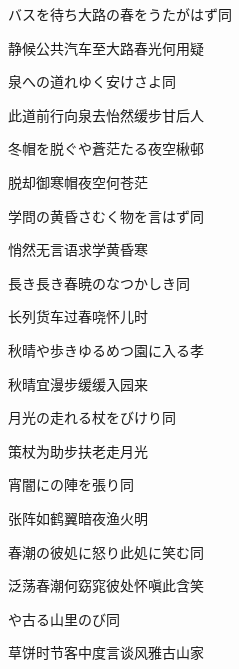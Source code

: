 \begin{haiku}
    {\FH バスを待ち大路の春をうたがはず}\hfill{\FH 同}

    {\FK 静候公共汽车至大路春光何用疑}
\end{haiku}

\begin{haiku}
    {\FH 泉への道れゆく安けさよ}\hfill{\FH 同}

    {\FK 此道前行向泉去怡然缓步甘后人}
\end{haiku}

\begin{haiku}
    {\FH 冬帽を脱ぐや蒼茫たる夜空}\hfill{\FH 楸邨}

    {\FK 脱却御寒帽夜空何苍茫}
\end{haiku}

\begin{haiku}
    {\FH 学問の黄昏さむく物を言はず}\hfill{\FH 同}

    {\FK 悄然无言语求学黄昏寒}
\end{haiku}

\begin{haiku}
    {\FH 長き長き春暁のなつかしき}\hfill{\FH 同}

    {\FK 长列货车过春哓怀儿时}
\end{haiku}

\begin{haiku}
    {\FH 秋晴や歩きゆるめつ園に入る}\hfill{\FH 孝}

    {\FK 秋晴宜漫步缓缓入园来}
\end{haiku}

\begin{haiku}
    {\FH 月光の走れる杖をびけり}\hfill{\FH 同}

    {\FK 策杖为助步扶老走月光}
\end{haiku}

\begin{haiku}
    {\FH 宵闇にの陣を張り}\hfill{\FH 同}

    {\FK 张阵如鹤翼暗夜渔火明}
\end{haiku}

\begin{haiku}
    {\FH 春潮の彼処に怒り此処に笑む}\hfill{\FH 同}

    {\FK 泛荡春潮何窈窕彼处怀嗔此含笑}
\end{haiku}

\begin{haiku}
    {\FH {}や古る山里のび}\hfill{\FH 同}

    {\FK 草饼时节客中度言谈风雅古山家}
\end{haiku}


